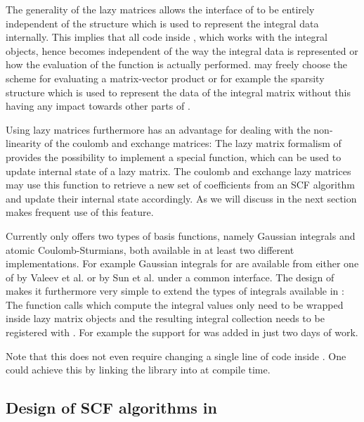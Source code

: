 The generality of the lazy matrices allows the interface of \gint
to be entirely independent of the structure
which is used to represent the integral data internally.
This implies that all code inside \molsturm,
which works with the integral objects,
hence becomes independent of the way the integral data is represented
or how the evaluation of the \contraction function is actually performed.
\gint may freely choose the scheme for evaluating a matrix-vector
product or for example the sparsity structure which is used to
represent the data of the integral matrix
without this having any impact towards other parts of \molsturm.

Using lazy matrices furthermore has an advantage for
dealing with the non-linearity of the coulomb and exchange matrices:
The lazy matrix formalism of \lazyten provides the possibility
to implement a special \update function,
which can be used to update internal state of a lazy matrix.
The coulomb and exchange lazy matrices
may use this function to retrieve a new set of coefficients from an
SCF algorithm and update
their internal state accordingly.
As we will discuss in the next section \gscf makes frequent use of this feature.

Currently \gint only offers two types of basis functions,
namely Gaussian integrals and atomic Coulomb-Sturmians,
both available in at least two different implementations.
For example Gaussian integrals for \gint are available from either one of 
\libint by Valeev et al.\cite{Libint2,Libint2_231}
or \libcint by Sun et al. 
under a common interface.
The design of \gint makes it furthermore very simple to extend the types of integrals
available in \molsturm:
The function calls which compute the integral values only need to be wrapped
inside lazy matrix objects and the resulting integral collection needs to be registered
with \gint.
For example the support for \libcint was added in just two days of work.

Note that this does not even require changing a single line of code inside \gint.
One could achieve this by linking the library into \molsturm at compile time.

%
%
\subsection{Design of SCF algorithms in \gscf}
\label{sec:gscf}


